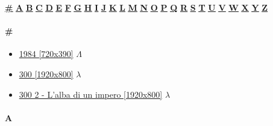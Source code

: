 
	
	\begin{center}
		\hyperlink{FI\#}{\textbf{\underline{\#}}}
		\hyperlink{FIA}{\textbf{\underline{A}}} \hyperlink{FIB}{\textbf{\underline{B}}} \hyperlink{FIC}{\textbf{\underline{C}}} \hyperlink{FID}{\textbf{\underline{D}}} \hyperlink{FIE}{\textbf{\underline{E}}} \hyperlink{FIF}{\textbf{\underline{F}}} \hyperlink{FIG}{\textbf{\underline{G}}} \hyperlink{FIH}{\textbf{\underline{H}}} \hyperlink{FII}{\textbf{\underline{I}}} \hyperlink{FIJ}{\textbf{\underline{J}}} \hyperlink{FIK}{\textbf{\underline{K}}} \hyperlink{FIL}{\textbf{\underline{L}}} \hyperlink{FIM}{\textbf{\underline{M}}} \hyperlink{FIN}{\textbf{\underline{N}}} \hyperlink{FIO}{\textbf{\underline{O}}} \hyperlink{FIP}{\textbf{\underline{P}}} \hyperlink{FIQ}{\textbf{\underline{Q}}} \hyperlink{FIR}{\textbf{\underline{R}}} \hyperlink{FIS}{\textbf{\underline{S}}} \hyperlink{FIT}{\textbf{\underline{T}}} \hyperlink{FIU}{\textbf{\underline{U}}} \hyperlink{FIV}{\textbf{\underline{V}}} \hyperlink{FIW}{\textbf{\underline{W}}} \hyperlink{FIX}{\textbf{\underline{X}}} \hyperlink{FIY}{\textbf{\underline{Y}}} \hyperlink{FIZ}{\textbf{\underline{Z}}}
	\end{center}
	
	\paragraph{\#} \hypertarget{FI \#}{}
	
		\begin{itemize}
			
			\item \href{https://mega.nz/#!lHBlCSaA!AQ24R2u2cGoyEoZX1D9lnoHRdEMZTIi1tC1HT22uLOw} {1984 [720x390]}  $\varLambda$ \\ 
			\item \href{https://mega.nz/#!usognKiJ!BC5Sggb-JCOsmgv5siz0DXQvctxsCJsxuybJ03I7zXU} {300 [1920x800]}  $\lambda$ \\ 
			\item \href{https://mega.nz/#!D8AC2IqY!rlggJAoxxhZ9H3GrVftDgSLrngh1M6k7pX8WrgyvRNQ} {300 2 - L'alba di un impero [1920x800]}  $\lambda$ \\ 
		
		\end{itemize}
	
	\paragraph{A} \hypertarget{FIA}{}
	
